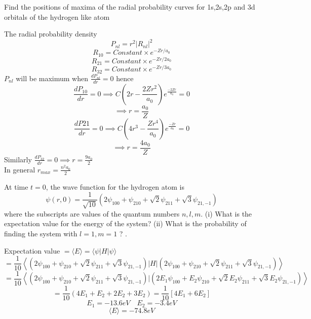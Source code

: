 \begin{exercise}
	Find the positions of maxima of the radial probability curves for 1s,2s,2p and 3d orbitals of the hydrogen like atom 
\end{exercise}
\begin{answer}
	The radial probability density \\
	$$P_{nl}=r^2|R_{nl}|^2$$
	$$R_{10}=Constant \times e^{-Zr/a_0}$$
	$$R_{21}=Constant \times e^{-Zr/2a_0}$$
	$$R_{32}=Constant \times e^{-Zr/3a_0}$$
	$P_{nl}$ will be maximum when $\frac{dP_{nl}}{dr}=0$ hence \\
	$$\frac{dP_{10}}{dr}=0 \implies C(2r-\frac{2Zr^2}{a_0})e^{\frac{-2Zr}{a_0}}=0$$
	$$\implies r=\frac{a_0}{Z}$$
	$$\frac{dP{21}}{dr}=0\implies C(4r^3-\frac{Zr^4}{a_0})e^{\frac{-Zr}{a_0}}=0$$
	$$\implies r=\frac{4a_0}{Z}$$
	Similarly $\frac{dP_{32}}{dr}=0\implies r=\frac{9a_0}{2}$\\
	In general $r_{max}=\frac{n^2a_0}{2}$
\end{answer}
\begin{exercise}
	 At time $t=0$, the wave function for the hydrogen atom is
	$$
	\psi(r, 0)=\frac{1}{\sqrt{10}}\left(2 \psi_{100}+\psi_{210}+\sqrt{2} \psi_{211}+\sqrt{3} \psi_{21,-1}\right)
	$$
	where the subscripts are values of the quantum numbers $n, l, m$. (i) What is the expectation value for the energy of the system? (ii) What is the probability of finding the system with $l=1, m=1$ ? .
\end{exercise}
\begin{answer}
	Expectation value $=\langle E \rangle =\langle \psi |H|\psi\rangle$\\
$$=\frac{1}{10}\left\langle \left(2 \psi_{100}+\psi_{210}+\sqrt{2} \psi_{211}+\sqrt{3} \psi_{21,-1}\right)|H|\left(2 \psi_{100}+\psi_{210}+\sqrt{2} \psi_{211}+\sqrt{3} \psi_{21,-1}\right)\right\rangle $$
$$=\frac{1}{10}\left\langle \left(2 \psi_{100}+\psi_{210}+\sqrt{2} \psi_{211}+\sqrt{3} \psi_{21,-1}\right)|\left(2E_1 \psi_{100}+E_2\psi_{210}+\sqrt{2} E_2\psi_{211}+\sqrt{3}E_2 \psi_{21,-1}\right)\right\rangle $$
$$=\frac{1}{10}\left( 4E_1+E_2+2E_2+3E_2\right) =\frac{1}{10}\left[ 4E_1+6E_2\right] $$
$$E_1=-13.6eV \quad E_2=-3.4eV$$
$$\langle E \rangle=-74.8eV$$
\end{answer}



